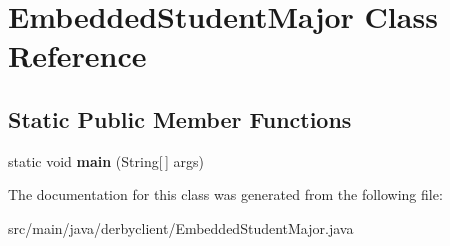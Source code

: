 \hypertarget{classEmbeddedStudentMajor}{}\section{Embedded\+Student\+Major Class Reference}
\label{classEmbeddedStudentMajor}
\subsection*{Static Public Member Functions}
\begin{DoxyCompactItemize}
\item 
\mbox{\label{classEmbeddedStudentMajor_a599b3408556c89c8ae3b56ae4ea3aa31}} 
static void {\bfseries main} (String\mbox{[}$\,$\mbox{]} args)
\end{DoxyCompactItemize}


The documentation for this class was generated from the following file\+:\begin{DoxyCompactItemize}
\item 
src/main/java/derbyclient/Embedded\+Student\+Major.\+java\end{DoxyCompactItemize}

